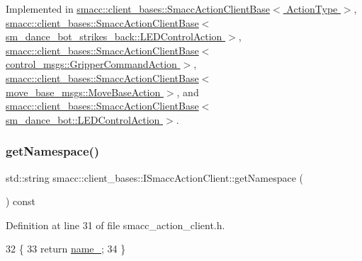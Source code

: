 Implemented in \hyperlink{classsmacc_1_1client__bases_1_1SmaccActionClientBase_aedeaf9704b73bf05b5522f7250416c9a}{smacc\+::client\+\_\+bases\+::\+Smacc\+Action\+Client\+Base$<$ Action\+Type $>$}, \hyperlink{classsmacc_1_1client__bases_1_1SmaccActionClientBase_aedeaf9704b73bf05b5522f7250416c9a}{smacc\+::client\+\_\+bases\+::\+Smacc\+Action\+Client\+Base$<$ sm\+\_\+dance\+\_\+bot\+\_\+strikes\+\_\+back\+::\+L\+E\+D\+Control\+Action $>$}, \hyperlink{classsmacc_1_1client__bases_1_1SmaccActionClientBase_aedeaf9704b73bf05b5522f7250416c9a}{smacc\+::client\+\_\+bases\+::\+Smacc\+Action\+Client\+Base$<$ control\+\_\+msgs\+::\+Gripper\+Command\+Action $>$}, \hyperlink{classsmacc_1_1client__bases_1_1SmaccActionClientBase_aedeaf9704b73bf05b5522f7250416c9a}{smacc\+::client\+\_\+bases\+::\+Smacc\+Action\+Client\+Base$<$ move\+\_\+base\+\_\+msgs\+::\+Move\+Base\+Action $>$}, and \hyperlink{classsmacc_1_1client__bases_1_1SmaccActionClientBase_aedeaf9704b73bf05b5522f7250416c9a}{smacc\+::client\+\_\+bases\+::\+Smacc\+Action\+Client\+Base$<$ sm\+\_\+dance\+\_\+bot\+::\+L\+E\+D\+Control\+Action $>$}.

\mbox{\label{classsmacc_1_1client__bases_1_1ISmaccActionClient_af7e68149691fe6c9284f6f80c19932d8}} 
\subsubsection{\texorpdfstring{get\+Namespace()}{getNamespace()}}
{\footnotesize\ttfamily std\+::string smacc\+::client\+\_\+bases\+::\+I\+Smacc\+Action\+Client\+::get\+Namespace (\begin{DoxyParamCaption}{ }\end{DoxyParamCaption}) const\hspace{0.3cm}{\ttfamily [inline]}}



Definition at line 31 of file smacc\+\_\+action\+\_\+client.\+h.


\begin{DoxyCode}
32         \{
33             \textcolor{keywordflow}{return} \hyperlink{classsmacc_1_1client__bases_1_1ISmaccActionClient_a74c660a4c111a3b8858b9b7b1cedc866}{name\_};
34         \}
\end{DoxyCode}
\mbox{\label{classsmacc_1_1client__bases_1_1ISmaccActionClient_a7380270966cec25f03ec288c747a2d7e}} 
